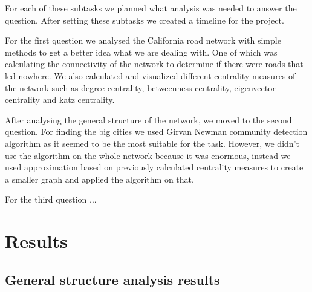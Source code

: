 \documentclass[11pt]{article}
\begin{document}
For each of these subtasks we planned what analysis was needed to answer the question. After setting these subtasks we created a timeline for the project. 

For the first question we analysed the California road network with simple methods to get a better idea what we are dealing with. One of which was calculating the connectivity of the network to determine if there were roads that led nowhere. We also calculated and visualized different centrality measures of the network such as degree centrality, betweenness centrality, eigenvector centrality and katz centrality. 

After analysing the general structure of the network, we moved to the second question. For finding the big cities we used Girvan Newman community detection algorithm as it seemed to be the most suitable for the task. However, we didn't use the algorithm on the whole network because it was enormous, instead we used approximation based on previously calculated centrality measures to create a smaller graph and applied the algorithm on that.

For the third question ...

\newpage

\section{Results}
\subsection{General structure analysis results}
\end{document}
